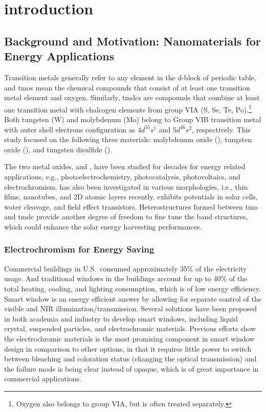 
\chapter{introduction}

\section{Background and Motivation: Nanomaterials for Energy Applications}

Transition metals generally refer to any element in the d-block of periodic table, and \glspl{tmo} mean the chemical compounds that consist of at least one transition metal element and oxygen. Similarly, \glspl{tmdc} are compounds that combine at least one transition metal with chalcogen elements from group VIA (S, Se, Te, Po).\footnote{Oxygen also belongs to group VIA, but is often treated separately.} Both tungsten (W) and molybdenum (Mo) belong to Group VIB transition metal with outer shell electrons configuration as $4d^55s^1$ and $5d^46s^2$, respectively. This study focused on the following three materials: molybdenum oxide (), tungsten oxide (), and tungsten disulfide ().
 
The two metal oxides,  and , have been studied for decades for energy related applications, e.g., photoelectrochemistry,\cite{Su2010} photocatalysis,\cite{Watcharenwong2008, Macphee2010} photovoltaics,\cite{Coridan2013} and electrochromism.\cite{Yoshimura1985, Mortimer2011}  has also been investigated in various morphologies, i.e., thin films, nanotubes, and 2D atomic layers recently.  exhibits potentials in solar cells,\cite{Britnell2013} water cleavage,\cite{Ballif1999} and field effect transistors.\cite{Perkins2013} Heterostructures formed between \gls{tmo} and \gls{tmdc} provide another degree of freedom to fine tune the band structures, which could enhance the solar energy harvesting performances.\cite{Chen2011b} 

\subsection{Electrochromism for Energy Saving}

Commercial buildings in U.S.\ consumed approximately 35\% of the electricity usage.\cite{us2008} And traditional windows in the buildings account for up to 40\% of the total heating, cooling, and lighting consumption, which is of low energy efficiency. Smart window is an energy efficient answer by allowing for separate control of the visible and NIR illumination/transmission. Several solutions have been proposed in both academia and industry to develop smart windows, including liquid crystal, suspended particles, and electrochromic materials.\cite{Lampert1998} Previous efforts show the electrochromic materials is the most promising component in smart window design in comparison to other options,\cite{Deb2008} in that it requires little power to switch between bleaching and coloration status (changing the optical transmission) and the failure mode is being clear instead of opaque, which is of great importance in commercial applications.

